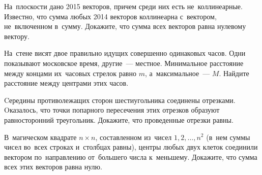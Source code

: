 \begin{problems}

\item
На~плоскости дано 2015 векторов, причем среди них есть не~коллинеарные.
Известно, что сумма любых 2014 векторов коллинеарна с~вектором, не~включенном
в~сумму.
Докажите, что сумма всех векторов равна нулевому вектору.

\item
На~стене висят двое правильно идущих совершенно одинаковых часов.
Одни показывают московское время, другие~--- местное.
Минимальное расстояние между концами их~часовых стрелок равно $m$,
а~максимальное~--- $M$.
Найдите расстояние между центрами этих часов.

\item
Cередины противолежащих сторон шестиугольника соединены отрезками.
Oказалось, что точки попарного пересечения этих отрезков образуют
равносторонний треугольник.
Докажите, что проведенные отрезки равны.

\item
В~магическом квадрате $n \times n$, составленном из~чисел $1, 2, \ldots, n^2$
(в~нем суммы чисел во~всех строках и~столбцах равны), центры любых двух клеток
соединили вектором по~направлению от~большего числа к~меньшему.
Докажите, что сумма всех этих векторов равна нулю.

\end{problems}

